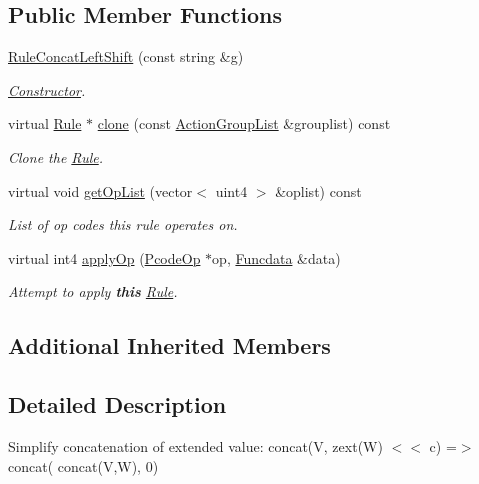 \subsection*{Public Member Functions}
\begin{DoxyCompactItemize}
\item 
\mbox{\hyperlink{class_rule_concat_left_shift_a234535865c59f7fb38a8ed8200821d27}{Rule\+Concat\+Left\+Shift}} (const string \&g)
\begin{DoxyCompactList}\small\item\em \mbox{\hyperlink{class_constructor}{Constructor}}. \end{DoxyCompactList}\item 
virtual \mbox{\hyperlink{class_rule}{Rule}} $\ast$ \mbox{\hyperlink{class_rule_concat_left_shift_a45bbbdffb4920db4a0bf043cdfd6783c}{clone}} (const \mbox{\hyperlink{class_action_group_list}{Action\+Group\+List}} \&grouplist) const
\begin{DoxyCompactList}\small\item\em Clone the \mbox{\hyperlink{class_rule}{Rule}}. \end{DoxyCompactList}\item 
virtual void \mbox{\hyperlink{class_rule_concat_left_shift_a64b4f306e3602adf370a622f7ec90963}{get\+Op\+List}} (vector$<$ uint4 $>$ \&oplist) const
\begin{DoxyCompactList}\small\item\em List of op codes this rule operates on. \end{DoxyCompactList}\item 
virtual int4 \mbox{\hyperlink{class_rule_concat_left_shift_aca7e943a778d99122e5d3c18f5d77f8f}{apply\+Op}} (\mbox{\hyperlink{class_pcode_op}{Pcode\+Op}} $\ast$op, \mbox{\hyperlink{class_funcdata}{Funcdata}} \&data)
\begin{DoxyCompactList}\small\item\em Attempt to apply {\bfseries{this}} \mbox{\hyperlink{class_rule}{Rule}}. \end{DoxyCompactList}\end{DoxyCompactItemize}
\subsection*{Additional Inherited Members}


\subsection{Detailed Description}
Simplify concatenation of extended value\+: {\ttfamily concat(V, zext(\+W) $<$$<$ c) =$>$ concat( concat(\+V,\+W), 0)} 

